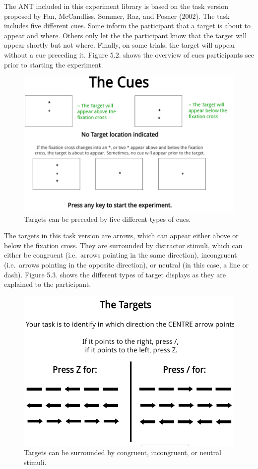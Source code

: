 \documentclass[
]{book}
\begin{document}
The ANT included in this experiment library is based on the task version proposed by Fan, McCandliss, Sommer, Raz, and Posner (2002). The task includes five different cues. Some inform the participant that a target is about to appear and where. Others only let the the participant know that the target will appear shortly but not where. Finally, on some trials, the target will appear without a cue preceding it. Figure 5.2. shows the overview of cues participants see prior to starting the experiment.

\begin{figure}

{\centering \includegraphics[width=0.8\linewidth]{images/ANT_Cues} 

}

\caption{Targets can be preceded by five different types of cues.}\label{fig:Figure3-2}
\end{figure}

The targets in this task version are arrows, which can appear either above or below the fixation cross. They are surrounded by distractor stimuli, which can either be congruent (i.e.~arrows pointing in the same direction), incongruent (i.e.~arrows pointing in the opposite direction), or neutral (in this case, a line or dash). Figure 5.3. shows the different types of target displays as they are explained to the participant.

\begin{figure}

{\centering \includegraphics[width=0.8\linewidth]{images/ANT_Targets} 

}

\caption{Targets can be surrounded by congruent, incongruent, or neutral stimuli.}\label{fig:Figure3-3}
\end{figure}
\end{document}
